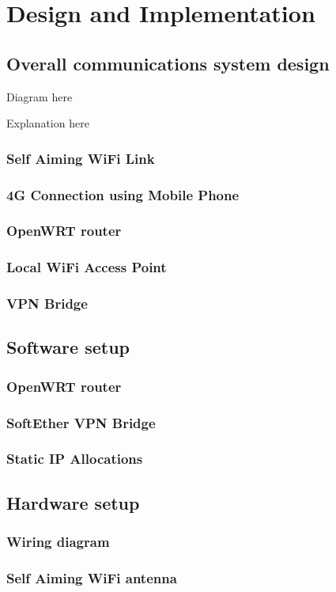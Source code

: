 \section{Design and Implementation}

\subsection{Overall communications system design}
Diagram here

Explanation here


\subsubsection{Self Aiming WiFi Link}
\subsubsection{4G Connection using Mobile Phone}
\subsubsection{OpenWRT router}
\subsubsection{Local WiFi Access Point}
\subsubsection{VPN Bridge}


\subsection{Software setup}
\subsubsection{OpenWRT router}
\subsubsection{SoftEther VPN Bridge}
\subsubsection{Static IP Allocations}

\subsection{Hardware setup}
\subsubsection{Wiring diagram}
\subsubsection{Self Aiming WiFi antenna}




